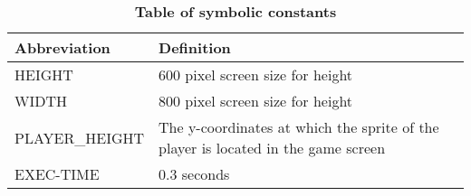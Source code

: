 \documentclass[12pt, titlepage]{article}
\begin{document}
\begin{table}[H]
\caption{\textbf{Table of symbolic constants}} \label{Table2}
\begin{tabularx}{\textwidth}{p{3.5cm}X}
\toprule
\textbf{Abbreviation} & \textbf{Definition} \\
\midrule
HEIGHT &  600 pixel screen size for height\\ \hline
WIDTH &  800 pixel screen size for height\\ \hline
PLAYER\_HEIGHT &  The y-coordinates at which the sprite of the player is located in the game screen \\ \hline
EXEC-TIME & 0.3 seconds \\  
\bottomrule
\end{tabularx}

\end{table}




\end{document}

